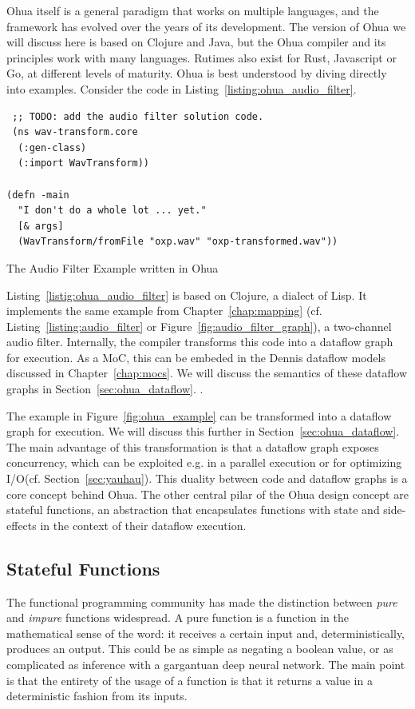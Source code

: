 Ohua itself is a general paradigm that works on multiple languages, and the framework has evolved over the years of its development.
The version of Ohua we will discuss here is based on Clojure and Java, but the Ohua compiler and its principles work with many languages.
Rutimes also exist for Rust, Javascript or Go, at different levels of maturity.
Ohua is best understood by diving directly into examples. Consider the code in Listing~\ref{listing:ohua_audio_filter}.

\begin{listing}
\begin{verbatim}
 ;; TODO: add the audio filter solution code.
 (ns wav-transform.core
  (:gen-class)
  (:import WavTransform))

(defn -main
  "I don't do a whole lot ... yet."
  [& args]
  (WavTransform/fromFile "oxp.wav" "oxp-transformed.wav")) 
\end{verbatim}
\caption{The Audio Filter Example written in Ohua}
\label{listing:ohua_audio_filter}
\end{listing}

Listing~\ref{listig:ohua_audio_filter} is based on Clojure, a dialect of Lisp.
It implements the same example from Chapter~\ref{chap:mapping} (cf. Listing~\ref{listing:audio_filter} or Figure~\ref{fig:audio_filter_graph}), a two-channel audio filter.
Internally, the compiler transforms this code into a dataflow graph for execution.
As a \ac{MoC}, this can be embeded in the Dennis dataflow models discussed in Chapter~\ref{chap:mocs}.
We will discuss the semantics of these dataflow graphs in Section~\ref{sec:ohua_dataflow}.
.

The example in Figure~\ref{fig:ohua_example} can be transformed into a dataflow graph for execution. We will discuss this further in Section~\ref{sec:ohua_dataflow}.
The main advantage of this transformation is that a dataflow graph exposes concurrency, which can be exploited e.g. in a parallel execution or for optimizing \ac{I/O}(cf. Section~\ref{sec:yauhau}).
This duality between code and dataflow graphs is a core concept behind Ohua.
The other central pilar of the Ohua design concept are stateful functions, an abstraction that encapsulates functions with state and side-effects in the context of their dataflow execution.

\subsection{Stateful Functions}
The functional programming community has made the distinction between \emph{pure} and \emph{impure} functions widespread.
A pure function is a function in the mathematical sense of the word: it receives a certain input and, deterministically, produces an output.
This could be as simple as negating a boolean value, or as complicated as inference with a gargantuan deep neural network.
The main point is that the entirety of the usage of a function is that it returns a value in a deterministic fashion from its inputs.

